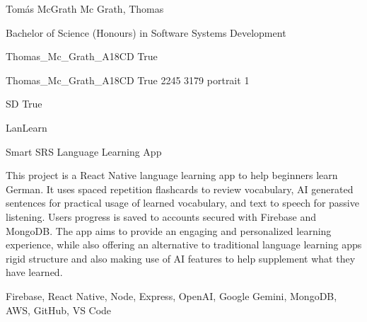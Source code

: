 
\begingroup{}\relax



\def\Key{Thomas_Mc_Grath_A18CD}

{Tomás McGrath}
{Mc Grath, Thomas}

{Bachelor of Science (Honours) in Software Systems Development}

{Thomas_Mc_Grath_A18CD}
{True}

{Thomas_Mc_Grath_A18CD}
{True}
{2245}
{3179}
{portrait}
{1}

{SD}
{True}

{LanLearn}

{Smart SRS Language Learning App}

{This project is a React Native language learning app to help beginners learn German. It uses spaced repetition flashcards to review vocabulary, AI generated sentences for practical usage of learned vocabulary, and text to speech for passive listening. Users progress is saved to accounts secured with Firebase and MongoDB. The app aims to provide an engaging and personalized learning experience, while also offering an alternative to traditional language learning apps rigid structure and also making use of AI features to help supplement what they have learned.}

{Firebase, React Native, Node, Express, OpenAI, Google Gemini, MongoDB, AWS, GitHub, VS Code}

